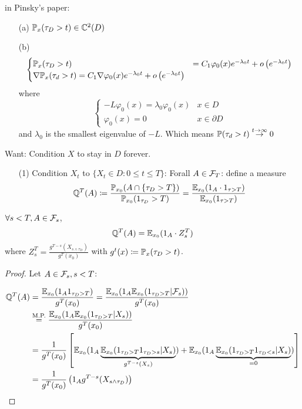  in Pinsky's paper:
\begin{enumerate}
    \item[(a)] $\mathbb{P}_x(\tau_D>t)\in\mathbb{C}^2(D)$
    \item[(b)] \[\begin{cases}
        \mathbb{P}_x(\tau_D>t)&=C_1\varphi_0(x)e^{-\lambda_0 t}+ o\left(e^{-\lambda_0t}\right)\\
        \nabla \mathbb{P}_x(\tau_d>t)=C_1\nabla \varphi_0(x)e^{-\lambda_0t}+o\left(e^{-\lambda_0t}\right)
    \end{cases}\] where \[\begin{cases}
        -L\varphi_0(x)=\lambda_0\varphi_0(x) & x\in D\\
        \varphi_0(x)=0 & x\in\partial D
    \end{cases}\] and $\lambda_0$ is the smallest eigenvalue of $-L$. 
    Which means $\mathbb{P}(\tau_d>t)\stackrel{t\to \infty}{\to} 0$
\end{enumerate}

Want: Condition $X$ to stay in $D$ forever.

\begin{enumerate}
    \item[(1)] Condition $X_t$ to $\{X_t\in D:0\leq t\leq T\}$: Forall $A\in\mathcal{F}_T$: define a measure \[\mathbb{Q}^T(A)\coloneqq \frac{\mathbb{P}_{x_0}(A\cap \{\tau_D>T\})}{\mathbb{P}_{x_0}(1_{\tau_D}>T)}=\frac{\mathbb{E}_{x_0}(1_A\cdot 1_{\tau> T})}{\mathbb{E}_{x_0}(1_{\tau>T})}\] 
\end{enumerate}

\begin{lemma}\label{lem:2.10}
    $\forall s<T,A\in\mathcal{F}_s$,
    \[\mathbb{Q}^T(A)=\mathbb{E}_{x_0}(1_A\cdot Z_s^T)\]
    where $Z_s^T=\frac{g^{T-s}(X_{s\land \tau_D})}{g^T(x_0)}$ with $g^t(x)\coloneqq \mathbb{P}_x(\tau_D>t)$.
\end{lemma}

\begin{proof}
    Let $A\in\mathcal{F}_s,s<T$:

    \begin{align*}
        \mathbb{Q}^T(A)&=\frac{\mathbb{E}_{x_0}(1_A1_{\tau_D>T})}{g^T(x_0)}=\frac{\mathbb{E}_{x_0}(1_A\mathbb{E}_{x_0}(1_{\tau_D>T}|\mathcal{F}_s))}{g^T(x_0)}\\
        &\stackrel{\text{M.P.}}{=}\frac{\mathbb{E}_{x_0}(1_A\mathbb{E}_{x_0}(1_{\tau_D>T}|X_s))}{g^T(x_0)}\\
        &=\frac{1}{g^T(x_0)}\left[\mathbb{E}_{x_0}(1_A\underbrace{\mathbb{E}_{x_0}(1_{\tau_D>T}1_{\tau_D>s}|X_s)}_{g^{T-s}(X_s)})+\mathbb{E}_{x_0}(1_A\underbrace{\mathbb{E}_{x_0}(1_{\tau_D>T}1_{\tau_D<s}|X_s)}_{=0})\right]\\
        &=\frac{1}{g^T(x_0)}\left(1_A g^{T-s}(X_{s\land \tau_D})\right)
    \end{align*}
\end{proof}

